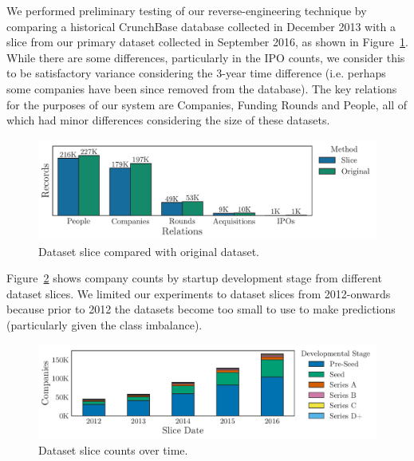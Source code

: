 \documentclass[../thesis/thesis.tex]{subfiles}
\begin{document}
We performed preliminary testing of our reverse-engineering technique by comparing a historical CrunchBase database collected in December 2013 with a slice from our primary dataset collected in September 2016, as shown in Figure~\ref{fig:design:counts_slice_method}. While there are some differences, particularly in the IPO counts, we consider this to be satisfactory variance considering the 3-year time difference (i.e. perhaps some companies have been since removed from the database). The key relations for the purposes of our system are Companies, Funding Rounds and People, all of which had minor differences considering the size of these datasets.

\begin{figure}[!htb]
    \centering
    \includegraphics[width=\textwidth]{../figures/design/counts_slice_method}
    \caption[Dataset slice compared with original database]{Dataset slice compared with original dataset.}
    \label{fig:design:counts_slice_method}
\end{figure}

Figure~\ref{fig:design:slice_counts_over_time} shows company counts by startup development stage from different dataset slices. We limited our experiments to dataset slices from 2012-onwards because prior to 2012 the datasets become too small to use to make predictions (particularly given the class imbalance).

\begin{figure}[!htb]
    \centering
    \includegraphics[width=\textwidth]{../figures/design/counts_stage_slice}
    \caption[Dataset counts over time]{Dataset slice counts over time.}
    \label{fig:design:slice_counts_over_time}
\end{figure}
\end{document}
